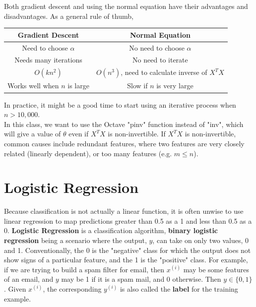 \noindent Both gradient descent and using the normal equation have their advantages and disadvantages.
As a general rule of thumb,

\begin{center}
    \begin{tabular}{|c|c|}
        \hline
        \textbf{Gradient Descent}       & \textbf{Normal Equation} \\
        \hline
        Need to choose $\alpha$         & No need to choose $\alpha$ \\
        \hline
        Needs many iterations           & No need to iterate \\
        \hline
        $O(kn^2)$                       & $O(n^3)$, need to calculate inverse of $X^T X$ \\
        \hline
        Works well when $n$ is large    & Slow if $n$ is very large \\
        \hline
    \end{tabular}
\end{center}

\noindent In practice, it might be a good time to start using an iterative process when $n>10,000$. \\

\noindent In this class, we want to use the Octave "pinv" function instead of "inv", which will give
a value of $\theta$ even if $X^T X$ is non-invertible. If $X^T X$ is non-invertible, common causes
include redundant features, where two features are very closely related (linearly dependent), or
too many features (e.g. $m\leq n$).



\pagebreak
\section{Logistic Regression}
Because classification is not actually a linear function, it is often unwise to use linear regression
to map predictions greater than 0.5 as a 1 and less than 0.5 as a 0. \textbf{Logistic Regression} is
a classification algorithm, \textbf{binary logistic regression} being a scenario where the output, $y$,
can take on only two values, 0 and 1. Conventionally, the 0 is the "negative" class for which the
output does not show signs of a particular feature, and the 1 is the "positive" class. For example, if
we are trying to build a spam filter for email, then $x^{(i)}$ may be some features of an email, and
$y$ may be 1 if it is a spam mail, and 0 otherwise. Then $y\in \{0,1\}$. Given $x^{(i)}$, the
corresponding $y^{(i)}$ is also called the \textbf{label} for the training example. \\

